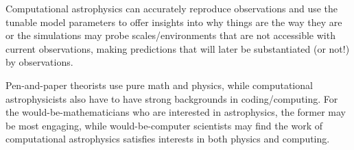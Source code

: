 Computational astrophysics can accurately reproduce observations and use the tunable model parameters to offer insights into why things are the way they are or the simulations may probe scales/environments that are not accessible with current observations, making predictions that will later be substantiated (or not!) by observations.

Pen-and-paper theorists use pure math and physics, while computational astrophysicists also have to have strong backgrounds in coding/computing. For the would-be-mathematicians who are interested in astrophysics, the former may be most engaging, while would-be-computer scientists may find the work of computational astrophysics satisfies interests in both physics and computing.